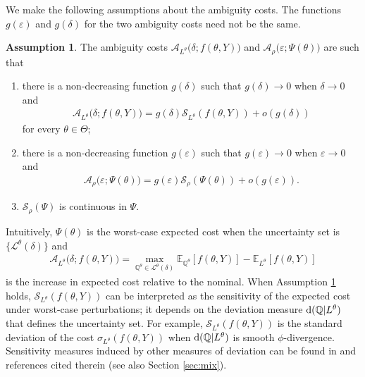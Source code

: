 \documentclass[11pt,reqno,letter]{amsart}
\theoremstyle{plain}
\theoremstyle{definition}
\newtheorem{assumption}[theorem]{Assumption}
\numberwithin{equation}{section}
\numberwithin{theorem}{section}
\numberwithin{table}{section}
\numberwithin{figure}{section}
\begin{document}
We make the following assumptions about the ambiguity costs. The functions $g(\varepsilon)$ and $g(\delta)$ for the two ambiguity costs need not be the same.
\begin{assumption} \label{ass:Bayes}
The ambiguity costs ${\mathcal A}_{L^\theta}\big(\delta; f(\theta, Y)\big)$  and ${\mathcal A}_{\rho}\big(\varepsilon; \Psi(\theta)\big)$ are such that 
\begin{enumerate}
\item there is a non-decreasing function $g(\delta)$ such that $g(\delta)\rightarrow 0$ when $\delta\rightarrow 0$ and 
\begin{eqnarray*}
{\mathcal A}_{L^\theta}\big(\delta; f(\theta, Y)\big) %
   =  g(\delta) {\mathcal S}_{L^\theta}(f(\theta, Y))+ o(g(\delta))
\end{eqnarray*}
for every $\theta\in{\Theta}$;
\item there is a non-decreasing function $g(\varepsilon)$ such that $g(\varepsilon)\rightarrow 0$ when $\varepsilon\rightarrow 0$ and 
\begin{eqnarray*}
{\mathcal A}_{\rho}\big(\varepsilon; \Psi(\theta)\big) %
=  %
g(\varepsilon) {\mathcal S}_\rho(\Psi(\theta)) + o(g(\varepsilon)).
\end{eqnarray*}
\item  ${\mathcal S}_{\rho}(\Psi)$ is continuous in $\Psi$. 
\end{enumerate}
\end{assumption}
Intuitively, $\Psi(\theta)$ is the worst-case expected cost when  the uncertainty set  is $\{{\mathcal L}^\theta(\delta)\}$ and
\begin{eqnarray*}
{\mathcal A}_{L^\theta}\big(\delta; f(\theta, Y)\big)= \max_{{\mathbb Q}^\theta \in {\mathcal L}^\theta(\delta)} {\mathbb E}_{{\mathbb Q}^\theta} [f(\theta, Y)] 
   -   {\mathbb E}_{L^\theta}[f(\theta, Y)]
   \end{eqnarray*} 
is the  increase in expected cost relative to the nominal. When Assumption \ref{ass:Bayes} holds,  ${\mathcal S}_{L^\theta}(f(\theta, Y))$  can be interpreted as the  sensitivity of the expected cost under worst-case perturbations; it depends on the deviation measure ${\rm d}({\mathbb Q} | L^\theta)$ that defines the uncertainty set. For example, ${\mathcal S}_{L^\theta}(f(\theta, Y))$ is the standard deviation of the cost $\sigma_{L^\theta} (f(\theta, Y))$ when ${\rm d}({\mathbb Q}|L^\theta)$ is smooth $\phi$-divergence. Sensitivity measures induced by other measures of deviation can be found in \cite{gotoh2026sensitivity} and references cited therein (see also Section \ref{sec:mix}).
   
\end{document}
